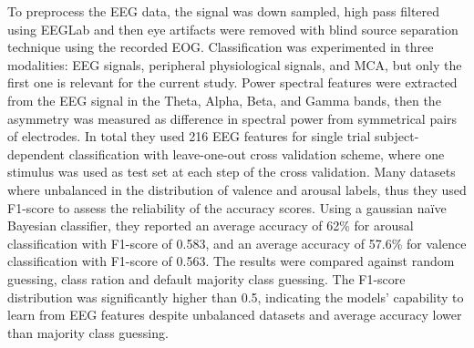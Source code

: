 To preprocess the \ac{EEG} data, the signal was down sampled, high pass filtered using EEGLab and then eye artifacts were removed with blind source separation technique using the recorded \ac{EOG}. Classification was experimented in three modalities: \ac{EEG} signals, peripheral physiological signals, and \ac{MCA}, but only the first one is relevant for the current study. Power spectral features were extracted from the \ac{EEG} signal in the Theta, Alpha, Beta, and Gamma bands, then the asymmetry was measured as difference in spectral power from symmetrical pairs of electrodes. In total they used 216 \ac{EEG} features for single trial subject-dependent classification with leave-one-out cross validation scheme, where one stimulus was used as test set at each step of the cross validation. Many datasets where unbalanced in the distribution of valence and arousal labels, thus they used F1-score to assess the reliability of the accuracy scores. Using a gaussian naïve Bayesian classifier, they reported an average accuracy of 62\% for arousal classification with F1-score of 0.583, and an average accuracy of 57.6\% for valence classification with F1-score of 0.563. The results were compared against random guessing, class ration and default majority class guessing. The F1-score distribution was significantly higher than 0.5, indicating the models’ capability to learn from \ac{EEG} features despite unbalanced datasets and average accuracy lower than majority class guessing.
\\
\\
